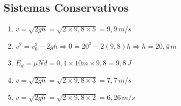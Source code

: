\documentclass[12pt,a4paper]{article}
\begin{document}
\subsection{Sistemas Conservativos}
\begin{enumerate}
\item $v = \sqrt{2gh} = \sqrt{2\times9{,}8\times5} = 9{,}9\,m/s$
\item $v^2 = v_0^2 - 2gh \Rightarrow 0 = 20^2 - 2(9{,}8)h \Rightarrow h = 20{,}4\,m$
\item $E_d = \mu N d = 0{,}1\times10m\times9{,}8=9{,}8\,J$
\item $v = \sqrt{2gh} = \sqrt{2\times9{,}8\times3} = 7{,}7\,m/s$
\item $v = \sqrt{2gh} = \sqrt{2\times9{,}8\times2} = 6{,}26\,m/s$
\end{enumerate}
\end{document}
